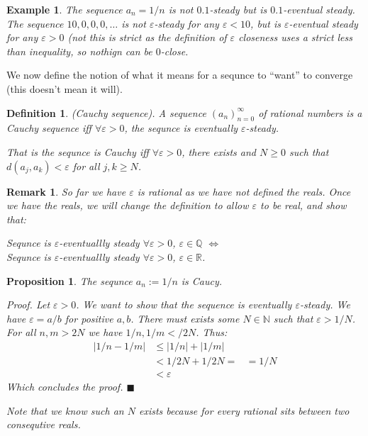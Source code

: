 \documentclass{article}
\newtheorem{example}{Example}[subsection]
\newtheorem{definition}{Definition}[subsection]
\newtheorem{remark}{Remark}[subsection]
\newtheorem{proposition}{Proposition}[subsection]
\newcommand{\R}{\mathbb{R}}
\newcommand{\Q}{\mathbb{Q}}
\newcommand{\N}{\mathbb{N}}
\newcommand{\vep}{\varepsilon} %
\let\it\textit
\begin{document}
\begin{example}
	The sequence $a_n = 1/n$ is not $0.1$-steady but is $0.1$-eventual 
	steady.	The sequence $10, 0, 0,0, \dots$ is not $\vep$-steady 
	for any $\vep < 10$, but is $\vep$-eventual steady for any
	$\vep > 0$ (not this is strict as the definition of $\vep$ 
	closeness uses a strict less than inequality, so nothign 
	can be $0$-close.
\end{example}

We now define the notion of what it means for a sequnce to ``want'' 
to converge (this doesn't mean it will).

\begin{definition}
	(Cauchy sequence). A sequence $(a_n)_{n=0}^\infty$ of rational
	numbers is a Cauchy sequence iff $\forall \vep > 0$, the
	sequnce is eventually $\vep$-steady.

	That is the sequnce is Cauchy iff $\forall \vep > 0$, there
	exists and $N\geq 0$ such that $d(a_j, a_k) < \vep$ for all
	$j,k \geq N$.
\end{definition}

\begin{remark}
	So far we have $\vep$ is rational as we have not defined 
	the reals. Once we have the reals, we will change 
	the definition to allow $\vep$ to be real, and show 
	that:
	\begin{center}
		Sequnce is $\vep$-eventuallly steady $\forall \vep > 0$,
		$\vep \in \Q$ $\iff$ \\
		Sequnce is $\vep$-eventuallly steady $\forall \vep > 0$,
		$\vep \in \R$.
	\end{center}
\end{remark}

\begin{proposition}
	The sequnce $a_n := 1/n$ is Caucy.

	\it{Proof}. Let $\vep > 0$. We want to show that the sequence
	is eventually $\vep$-steady. We have $\vep = a/b$ for positive 
	$a,b$. There must exists some $N \in \N$ such that $\vep > 1/N$.
	For all $n,m > 2N$ we have $1/n, 1/m < /2N$. Thus:
	\begin{align*}
		|1/n - 1/m| &\leq |1/n| + |1/m| \\
			    &< 1/2N + 1/2N = 
			    &=1/N \\
			    &< \vep
	\end{align*}
	Which concludes the proof. \hfill $\blacksquare$

	Note that we know such an $N$ exists because for every rational sits 
	between two consequtive reals.
\end{proposition}
\end{document}

